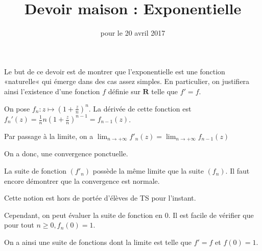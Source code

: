 \documentclass[11pt,a4paper,french]{article}
\title{Devoir maison \no 5 : Exponentielle}
\author{\bsc{Jumel}}
\date{pour le 20 avril 2017}
\makeatletter
\renewcommand{\maketitle}%
{\framebox{%
    \begin{minipage}{1.0\linewidth}%
      \begin{center}%
        \Large \@title ~-- \@author \\%
        \@date%
      \end{center}%
    \end{minipage}}%
  \normalsize%
}
\newcommand{\R}{\mathbf{R}}
\theoremstyle{break}
\theoremstyle{plain}
\theoremstyle{nonumberplain}
\theoremstyle{nonumberbreak}
\makeatother
\begin{document}
\noindent\maketitle

\bigskip

Le but de ce devoir est de montrer que l'exponentielle est une fonction
«naturelle« qui émerge dans des cas assez simples. En particulier, on
justifiera ainsi l'existence d'une fonction $f$ définie sur $\R$ telle
que $f' = f$.

On pose $f_n \colon z \mapsto \left( 1 + \frac{z}n \right)^n$. La
dérivée de cette fonction est $f_n'(z) = \frac{1}n n \left( 1 + \frac{z}n
\right)^{n-1} = f_{n-1}(z)$.

Par passage à la limite, on a $\lim_{n\to+\infty} f'_n (z) =
\lim_{n\to+\infty} f_{n-1} (z)$

On a donc, une convergence ponctuelle.

La suite de fonction $(f'_n)$ possède la même limite que la suite
$(f_n)$. Il faut encore démontrer que la convergence est normale.

Cette notion est hors de portée d'élèves de TS pour l'instant.


Cependant, on peut évaluer la suite de fonction en 0. Il est facile de
vérifier que pour tout $n \geqslant 0, f_n(0) = 1$.

On a ainsi une suite de fonctions dont la limite est telle que $f' = f$
et $f(0) = 1$.








\end{document}
